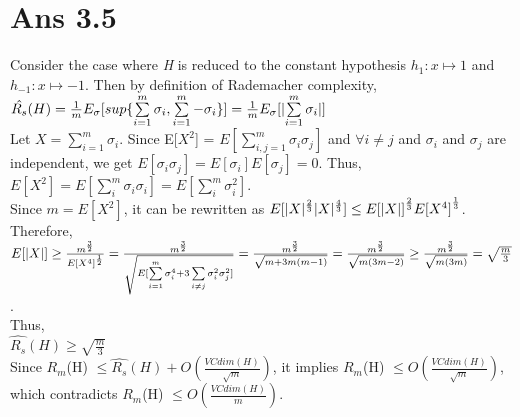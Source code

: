 \documentclass[10pt]{article}
\DeclarePairedDelimiter{\abs}{\lvert}{\rvert}
\begin{document}
\section*{Ans 3.5}
\begin{flushleft}
Consider the case where \textit{H} is reduced to the constant hypothesis $h_{1} : x \mapsto 1$ and $h_{-1}: x \mapsto -1$. Then by definition of Rademacher complexity, \\
\hspace{2em} $\hat{R_{s}}(H) = \frac{1}{m} E_{\sigma} [sup \{\sum\limits_{i =1}^{m} \sigma_{i}, \sum\limits_{i=1}^{m} - \sigma_{i} \}] = \frac{1}{m} E_{\sigma} [\abs{\sum\limits_{i=1}^{m} \sigma_{i}}]$\\
\vspace{0.5em}
Let $X = \sum\limits_{i=1}^{m} \sigma_{i}$. Since E[$X^{2}$] = $E[\sum\limits_{i,j=1}^{m} \sigma_{i} \sigma_{j}]$ and $\forall i\neq j$ and $\sigma_{i}$ and $\sigma_{j}$ are independent, we get $E[\sigma_{i} \sigma_{j}] = E[\sigma_{i}] E[\sigma_{j}] = 0$. Thus, \\
\vspace{0.5em}
\hspace{2em} $E[X^{2}] = E[\sum\limits_{i}^{m} \sigma_{i} \sigma_{i}] = E[\sum\limits_{i}^{m} \sigma_{i}^{2}]$.\\
Since $m = E[X^{2}]$, it can be rewritten as $E[\abs{X}^{\frac{2}{3}} \abs{X}^{\frac{4}{3}}] \leq E{[\abs{X}]}^{\frac{2}{3}} E{[X^{4}]}^{\frac{1}{3}}$.\\
\vspace{0.5em}
Therefore,\\
\hspace{2em} $E[\abs{X}] \geq \frac{m^{\frac{3}{2}}}{E{[X^{4}]}^{\frac{1}{2}}} = \frac{m^{\frac{3}{2}}}{\sqrt{E[\sum\limits_{i=1}^{m} \sigma_{i}^{4} + 3 \sum\limits_{i \neq j} \sigma_{i}^{2} \sigma_{j}^{2}]}} = \frac{m^{\frac{3}{2}}}{\sqrt{m + 3m(m-1)}} = \frac{m^{\frac{3}{2}}}{\sqrt{m(3m-2)}} \geq \frac{m^{\frac{3}{2}}}{\sqrt{m(3m)}} = \sqrt{\frac{m}{3}}$.\\
\vspace{0.5em}
Thus,\\
\hspace{2em} $\hat{R_{s}}(H) \geq \sqrt{\frac{m}{3}}$\\
\vspace{0.5em}
Since $R_{m}$(H) $\leq \hat{R_{s}}(H) + O(\frac{VCdim(H)}{\sqrt{m}})$, it implies $R_{m}$(H) $\leq O(\frac{VCdim(H)}{\sqrt{m}})$, which contradicts $R_{m}$(H) $\leq O(\frac{VCdim(H)}{m})$.
\end{flushleft}
\end{document}
